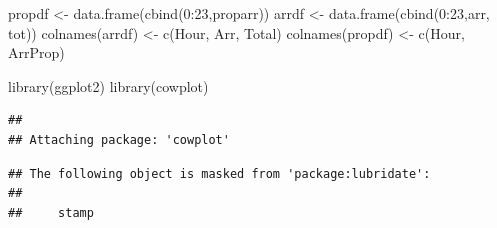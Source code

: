 \documentclass[
]{article}
\newenvironment{Shaded}{\begin{snugshade}}{\end{snugshade}}
\newcommand{\DecValTok}[1]{\textcolor[rgb]{0.00,0.00,0.81}{#1}}
\newcommand{\FunctionTok}[1]{\textcolor[rgb]{0.00,0.00,0.00}{#1}}
\newcommand{\NormalTok}[1]{#1}
\newcommand{\OtherTok}[1]{\textcolor[rgb]{0.56,0.35,0.01}{#1}}
\newcommand{\SpecialCharTok}[1]{\textcolor[rgb]{0.00,0.00,0.00}{#1}}
\newcommand{\StringTok}[1]{\textcolor[rgb]{0.31,0.60,0.02}{#1}}
\begin{document}
\begin{Shaded}
\begin{Highlighting}[]
\NormalTok{propdf }\OtherTok{\textless{}{-}} \FunctionTok{data.frame}\NormalTok{(}\FunctionTok{cbind}\NormalTok{(}\DecValTok{0}\SpecialCharTok{:}\DecValTok{23}\NormalTok{,proparr))}
\NormalTok{arrdf }\OtherTok{\textless{}{-}} \FunctionTok{data.frame}\NormalTok{(}\FunctionTok{cbind}\NormalTok{(}\DecValTok{0}\SpecialCharTok{:}\DecValTok{23}\NormalTok{,arr, tot))}
\FunctionTok{colnames}\NormalTok{(arrdf) }\OtherTok{\textless{}{-}} \FunctionTok{c}\NormalTok{(}\StringTok{\textquotesingle{}Hour\textquotesingle{}}\NormalTok{, }\StringTok{\textquotesingle{}Arr\textquotesingle{}}\NormalTok{, }\StringTok{\textquotesingle{}Total\textquotesingle{}}\NormalTok{)}
\FunctionTok{colnames}\NormalTok{(propdf) }\OtherTok{\textless{}{-}} \FunctionTok{c}\NormalTok{(}\StringTok{\textquotesingle{}Hour\textquotesingle{}}\NormalTok{, }\StringTok{\textquotesingle{}ArrProp\textquotesingle{}}\NormalTok{)}
\end{Highlighting}
\end{Shaded}

\begin{Shaded}
\begin{Highlighting}[]
\FunctionTok{library}\NormalTok{(ggplot2)}
\FunctionTok{library}\NormalTok{(cowplot)}
\end{Highlighting}
\end{Shaded}

\begin{verbatim}
## 
## Attaching package: 'cowplot'
\end{verbatim}

\begin{verbatim}
## The following object is masked from 'package:lubridate':
## 
##     stamp
\end{verbatim}
\end{document}
